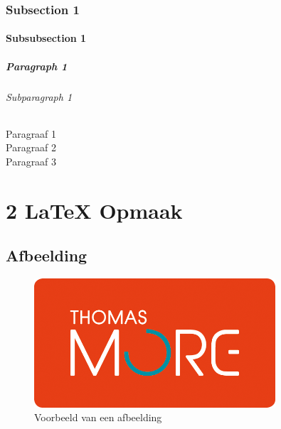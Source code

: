 \documentclass[a4paper, 11pt]{report}
\begin{document}
\subsection{Subsection 1}
\lipsum[2]
\subsubsection{Subsubsection 1}
\lipsum[3]
\paragraph{Paragraph 1}
\lipsum[4]

\setlength\parindent{24pt} %
\subparagraph{Subparagraph 1}
Paragraaf 1 \\
\noindent Paragraaf 2 \\
\noindent Paragraaf 3
\setlength\parindent{0pt}


\chapter*{2 LaTeX Opmaak}
\setcounter{chapter}{2}
\setcounter{section}{0}
\lipsum[1][1-5]

\section{Afbeelding}
\begin{figure}[H]
	\centering
	\includegraphics[width=0.8\textwidth]{tm-vb}
	\caption{Voorbeeld van een afbeelding}
	\label{fig:voorbeeld-afbeelding}
\end{figure}
\end{document}

